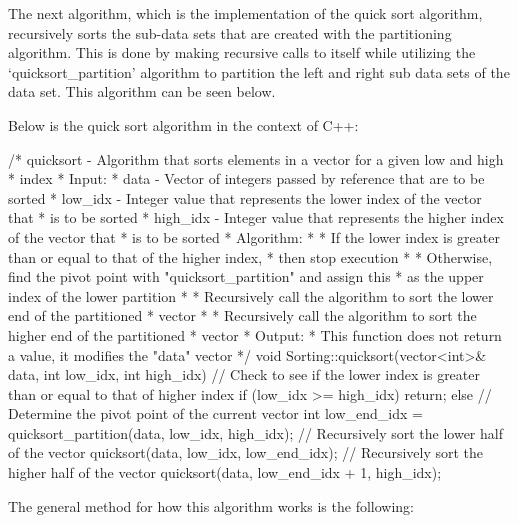 The next algorithm, which is the implementation of the quick sort algorithm, recursively sorts the sub-data sets that are created with the partitioning algorithm. This is done
by making recursive calls to itself while utilizing the `quicksort\_partition' algorithm to partition the left and right sub data sets of the data set. This algorithm can be seen below.

\begin{highlight}
Below is the quick sort algorithm in the context of C++:

\begin{code}
/*  quicksort - Algorithm that sorts elements in a vector for a given low and high 
*               index
*   Input:
*     data - Vector of integers passed by reference that are to be sorted
*     low_idx - Integer value that represents the lower index of the vector that 
*               is to be sorted
*     high_idx - Integer value that represents the higher index of the vector that 
*               is to be sorted
*   Algorithm:
*     * If the lower index is greater than or equal to that of the higher index, 
*       then stop execution
*     * Otherwise, find the pivot point with "quicksort_partition" and assign this 
*       as the upper index of the lower partition
*     * Recursively call the algorithm to sort the lower end of the partitioned 
*       vector
*     * Recursively call the algorithm to sort the higher end of the partitioned 
*       vector
*   Output:
*     This function does not return a value, it modifies the "data" vector
*/
void Sorting::quicksort(vector<int>& data, int low_idx, int high_idx){
    // Check to see if the lower index is greater than or equal to that of higher index
    if (low_idx >= high_idx) {
        return;
    }
    else {
        // Determine the pivot point of the current vector
        int low_end_idx = quicksort_partition(data, low_idx, high_idx);
        // Recursively sort the lower half of the vector
        quicksort(data, low_idx, low_end_idx);
        // Recursively sort the higher half of the vector
        quicksort(data, low_end_idx + 1, high_idx);
    }
}
\end{code}

The general method for how this algorithm works is the following:


\end{highlight}
